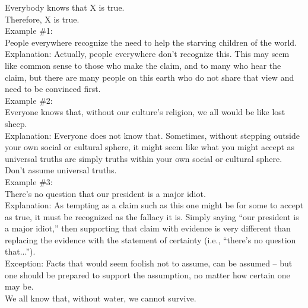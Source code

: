 \documentclass[a4paper,12pt,single,pdftex]{scrartcl}
\begin{document}
    
      Everybody knows that X is true.
    \\

    
      Therefore, X is true.
    \\

    
      Example \#1:
    \\

    
      People everywhere recognize the need to help the starving children of the world.
    \\

    
      Explanation: Actually, people everywhere don’t recognize this.  This may seem like common sense to those who make the claim, and to many who hear the claim, but there are many people on this earth who do not share that view and need to be convinced first.
    \\

    
      Example \#2:
    \\

    
      Everyone knows that, without our culture's religion, we all would be like lost sheep.
    \\

    
      Explanation: Everyone does not know that.  Sometimes, without stepping outside your own social or cultural sphere, it might seem like what you might accept as universal truths are simply truths within your own social or cultural sphere.  Don’t assume universal truths.
    \\

    
      Example \#3:
    \\

    
      There’s no question that our president is a major idiot.
    \\

    
      Explanation: As tempting as a claim such as this one might be for some to accept as true, it must be recognized as the fallacy it is. Simply saying “our president is a major idiot,” then supporting that claim with evidence is very different than replacing the evidence with the statement of certainty (i.e., “there’s no question that...”).
    \\

    
      Exception: Facts that would seem foolish not to assume, can be assumed -- but one should be prepared to support the assumption, no matter how certain one may be.
    \\

    
      We all know that, without water, we cannot survive.
    \\
\end{document}
